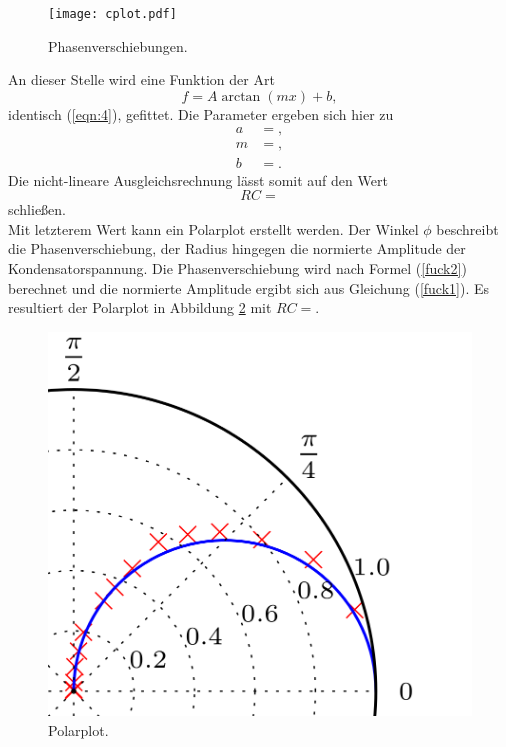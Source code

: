 \begin{figure}[H]
  \centering
  \texttt{[image: cplot.pdf]}
  \caption{Phasenverschiebungen.}
  \label{abb:4}
\end{figure}

An dieser Stelle wird eine Funktion der Art
\begin{equation}
  f = A\arctan(mx)+b,
\end{equation}
identisch (\ref{eqn:4}), gefittet.
Die Parameter ergeben sich hier zu
\begin{align*}
  a &= , \\
  m &= ,  \\
  b &= .
\end{align*}
Die nicht-lineare Ausgleichsrechnung lässt somit auf den Wert
\begin{equation}
  RC = 
\end{equation}
schließen.\\
Mit letzterem Wert kann ein Polarplot erstellt werden.
Der Winkel $\phi$ beschreibt die Phasenverschiebung, der Radius hingegen die normierte Amplitude der Kondensatorspannung.
Die Phasenverschiebung wird nach Formel (\ref{fuck2}) berechnet und die normierte Amplitude ergibt sich aus Gleichung (\ref{fuck1}).
Es resultiert der Polarplot in Abbildung \ref{abb:5} mit $RC = $.

\begin{figure}[H]
  \centering
  \includegraphics{fake_plot.png}
  \caption{Polarplot.}
  \label{abb:5}
\end{figure}

